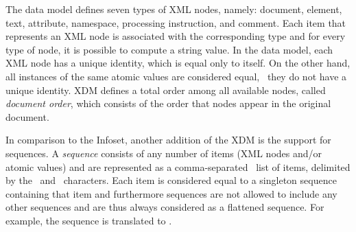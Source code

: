 The data model defines seven types of \ac{XML} nodes, namely: document, element, text, attribute, namespace, processing
instruction, and comment.  Each item that represents an \ac{XML} node is associated with the corresponding type and for
every type of node, it is possible to compute a string value.
%
In the data model, each \ac{XML} node has a unique identity, which is equal only to itself.  On the other hand, all
instances of the same atomic values are considered equal, \ie~they do not have a unique identity.
%
XDM defines a total order among all available nodes, called \emph{document order}, which consists of the order that
nodes appear in the original document.

In comparison to the \ac{Infoset}, another addition of the \ac{XDM} is the support for sequences.  A \emph{sequence}
consists of any number of items (\ac{XML} nodes and/or atomic values) and are represented as a
comma-separated~\character{,} list of items, delimited by the~\character{(} and~\character{)} characters.
%
Each item is considered equal to a singleton sequence containing that item and furthermore sequences are not allowed to
include any other sequences and are thus always considered as a flattened sequence.
%
For example, the sequence  is translated to .


